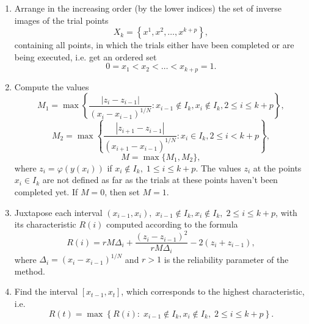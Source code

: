 \documentclass{cmi}
\begin{document}
\begin{enumerate} \item Arrange in the increasing order (by the lower indices) the set of inverse images of the trial points
	\begin{displaymath} 
		X_k=\left\{x^1,x^2,\ldots,x^{k+p}\right\}, 
	\end{displaymath} 
	containing all points, in which the trials either have been completed or are being executed, i.e. get an  ordered set 
	\begin{displaymath} 
		0=x_1<x_2<\ldots<x_{k+p}=1. 
	\end{displaymath} 
	
	\item Compute the values 
	\begin{displaymath} 
		M_1=\max{\left\{\frac{\left|z_i-z_{i-1}\right|}{\left(x_i-x_{i-1}\right)^{1/N}}:x_{i-1}\notin  I_k,x_i\notin I_k,2\le i\le k+p\right\}}, 
	\end{displaymath} 
	\begin{displaymath} 
		M_2=\max{\left\{\frac{\left|z_{i+1}-z_{i-1}\right|}{\left(x_{i+1}-x_{i-1}\right)^{1/N}}:x_i\in  I_k,2\le i<k+p\right\}}, 
	\end{displaymath} 
	\begin{displaymath} 
		M=\max{\{}M_1,M_2\}, 
	\end{displaymath} 
	where $ z_i=\varphi\left(y\left(x_i\right)\right)$ if $x_i\notin I_k,\;1\le i\le k+p$. The values $z_i$ at the points $x_i\in I_k$ are not defined as far as the trials at these points haven't been completed yet. If $M=0$, then set $M=1$.
	
	\item Juxtapose each interval $\left(x_{i-1},x_i\right),\;x_{i-1}\notin I_k,x_i\notin I_k,\;2\le i\le  k+p$, with its characteristic $R\left(i\right)$ computed according to the formula 
	\begin{displaymath} 
		R\left(i\right)=rM\Delta_i+\frac{\left(z_i-z_{i-1}\right)^2}{rM\Delta_i}-2\left(z_i+z_{i-1}\right), 
	\end{displaymath} 
	where $\Delta_i=\left(x_i-x_{i-1}\right)^{1/N}$ and $ r>1$ is the reliability parameter of the method.
	
	\item Find the interval $\left[x_{t-1},x_t\right]$, which corresponds to the highest characteristic, i.e.
	\begin{displaymath} 
		R\left(t\right)=\max{\left\{R\left(i\right):\;x_{i-1}\notin I_k,x_i\notin I_k,\;2\le i\le k+p\right\}}. 
	\end{displaymath} 
	

\end{enumerate}
\end{document}
